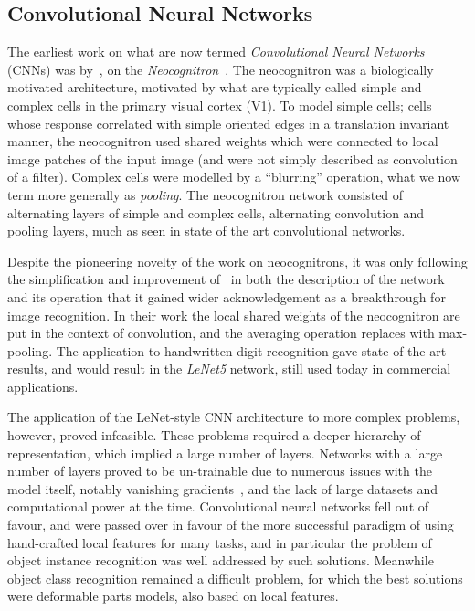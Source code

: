 \documentclass[thesis]{subfiles}
\begin{document}
\subsection{Convolutional Neural Networks}
The earliest work on what are now termed \emph{Convolutional Neural Networks} (CNNs) was by~\citet{Fuk80}, on the \emph{Neocognitron}~\citep{fukushima2013artificial}. The neocognitron was a biologically motivated architecture, motivated by what are typically called simple and complex cells in the primary visual cortex (V1). To model simple cells; cells whose response correlated with simple oriented edges in a translation invariant manner, the neocognitron used shared weights which were connected to local image patches of the input image (and were not simply described as convolution of a filter). Complex cells were modelled by a ``blurring'' operation, what we now term more generally as \emph{pooling}. The neocognitron network consisted of alternating layers of simple and complex cells, \ie alternating convolution and pooling layers, much as seen in state of the art convolutional networks.

Despite the pioneering novelty of the work on neocognitrons, it was only following the simplification and improvement of~\citet{Lecun1998} in both the description of the network and its operation that it gained wider acknowledgement as a breakthrough for image recognition. In their work the local shared weights of the neocognitron are put in the context of convolution, and the averaging operation replaces with max-pooling. The application to handwritten digit recognition gave state of the art results, and would result in the \emph{LeNet5} network, still used today in commercial applications.

The application of the LeNet-style CNN architecture to more complex problems, however, proved infeasible. These problems required a deeper hierarchy of representation, which implied a large number of layers. Networks with a large number of layers proved to be un-trainable due to numerous issues with the model itself, notably vanishing gradients~\citep{hochreiter1991untersuchungen}, and the lack of large datasets and computational power at the time. Convolutional neural networks fell out of favour, and were passed over in favour of the more successful paradigm of using hand-crafted local features for many tasks, and in particular the problem of object instance recognition was well addressed by such solutions. Meanwhile object class recognition remained a difficult problem, for which the best solutions were deformable parts models, also based on local features.
\end{document}
